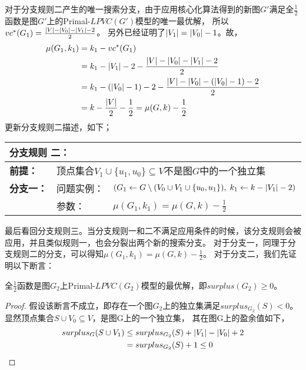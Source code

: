 对于分支规则二产生的唯一搜索分支，由于应用核心化算法得到的新图$G'$满足全$\frac{1}{2}$函数是图$G'$上的Primal-$LPVC(G')$模型的唯一最优解，
所以$vc^*(G_1) = \frac{\left\vert V \right\vert - \left\vert V_0 \right\vert - \left\vert V_1 \right\vert - 2}{2}$。
另外已经证明了$\left\vert V_1 \right\vert = \left\vert V_0 \right\vert - 1$。故，
\begin{equation*} \begin{aligned}
    \mu(G_1, k_1) & = k_1 - vc^*(G_1)  \\
                  & = k_1 - \left\vert V_1 \right\vert - 2 - \frac{\left\vert V \right\vert - \left\vert V_0 \right\vert - \left\vert V_1 \right\vert - 2}{2} \\
                  & = k_1 - (\left\vert V_0 \right\vert - 1) - 2 - \frac{\left\vert V \right\vert - \left\vert V_0 \right\vert - (\left\vert V_0 \right\vert - 1) - 2}{2} \\
                  & = k - \frac{\left\vert V \right\vert}{2} - \frac{1}{2} = \mu(G, k) - \frac{1}{2}
\end{aligned} \end{equation*}
更新分支规则二描述，如下；\\

\begin{tabular}{ p{0.12\headwidth} | p{0.12\headwidth}p{0.66\headwidth} }
  \multicolumn{3}{l}{ \textbf{分支规则 二：} }\\
  \hline
  \textbf{前提：}  & \multicolumn{2}{l}{顶点集合$V_1 \cup \{u_1, u_0\}\subseteq V$不是图$G$中的一个独立集}\\
  \hline
  \textbf{分支一：} & 问题实例：&$(G_1 \leftarrow G \setminus (V_0 \cup V_1 \cup \{u_0, u_1\}),\; k_1 \leftarrow k - \left\vert V_1 \right\vert - 2)$ \\
                    & 参数：&$\mu(G_1, k_1) = \mu(G, k) - \frac{1}{2}$\\
  \hline
\end{tabular} \vspace{0.5cm}  

\vspace{0.5cm}
最后看回分支规则三。当分支规则一和二不满足应用条件的时候，该分支规则会被应用，并且类似规则一，也会分裂出两个新的搜索分支。
对于分支一，同理于分支规则二的分支，可以得知$\mu(G_1, k_1) = \mu(G, k) - \frac{1}{2}$。
对于分支二，我们先证明以下断言：
\begin{claim}
全$\frac{1}{2}$函数是图$G_2$上Primal-$LPVC(G_2)$模型的最优解，即$surplus(G_2) \ge 0$。
\end{claim}
\begin{proof}
假设该断言不成立，即存在一个图$G_2$上的独立集满足$surplus_{G_2}(S) < 0$。
显然顶点集合$S \cup V_0 \subseteq V$，是图G上的一个独立集，
其在图G上的盈余值如下，
\begin{equation*} \begin{aligned}
  surplus_G(S \cup V_1) &\le surplus_{G_2}(S) + \left\vert V_1 \right\vert  - \left\vert V_0 \right\vert + 2 \\
                        &= surplus_{G_2}(S) + 1 \le 0
\end{aligned} \end{equation*}
\end{proof}

